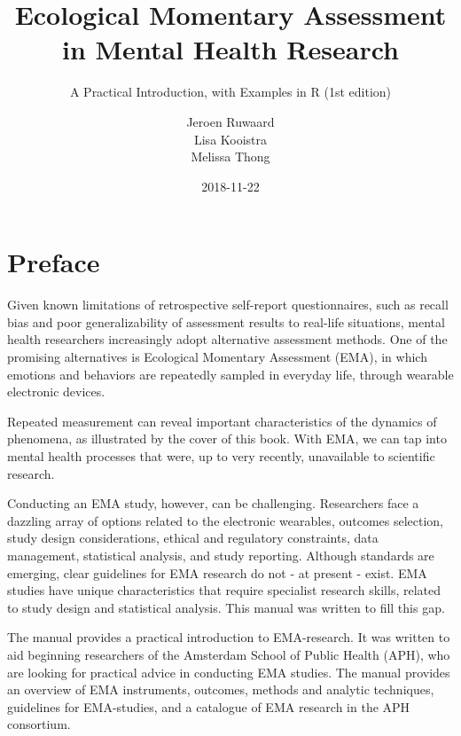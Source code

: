 \documentclass[]{book}
\title{Ecological Momentary Assessment in Mental Health Research}
\subtitle{A Practical Introduction, with Examples in R (1st edition)}
\author{Jeroen Ruwaard \\ Lisa Kooistra \\ Melissa Thong}
\date{2018-11-22}
\let\oldmaketitle\maketitle
\begin{document}
\maketitle

\thispagestyle{empty}


\let\maketitle\oldmaketitle
\maketitle

{
\setcounter{tocdepth}{1}
\tableofcontents
}
\chapter*{Preface}\label{preface}

Given known limitations of retrospective self-report questionnaires,
such as recall bias and poor generalizability of assessment results to
real-life situations, mental health researchers increasingly adopt
alternative assessment methods. One of the promising alternatives is
Ecological Momentary Assessment (EMA), in which emotions and behaviors
are repeatedly sampled in everyday life, through wearable electronic
devices.

Repeated measurement can reveal important characteristics of the
dynamics of phenomena, as illustrated by the cover of this book. With
EMA, we can tap into mental health processes that were, up to very
recently, unavailable to scientific research.

Conducting an EMA study, however, can be challenging. Researchers face a
dazzling array of options related to the electronic wearables, outcomes
selection, study design considerations, ethical and regulatory
constraints, data management, statistical analysis, and study reporting.
Although standards are emerging, clear guidelines for EMA research do
not - at present - exist. EMA studies have unique characteristics that
require specialist research skills, related to study design and
statistical analysis. This manual was written to fill this gap.

The manual provides a practical introduction to EMA-research. It was
written to aid beginning researchers of the Amsterdam School of Public
Health (APH), who are looking for practical advice in conducting EMA
studies. The manual provides an overview of EMA instruments, outcomes,
methods and analytic techniques, guidelines for EMA-studies, and a
catalogue of EMA research in the APH consortium.
\end{document}
